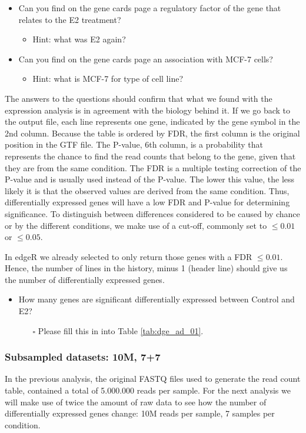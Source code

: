 \begin{itemize}
	\item Can you find on the gene cards page a regulatory factor of the gene that relates
to the E2 treatment?
	\begin{itemize}
		\item Hint: what was E2 again?
	\end{itemize}
	\item Can you find on the gene cards page an association with MCF-7 cells?
	\begin{itemize}
		\item Hint: what is MCF-7 for type of cell line?
	\end{itemize}
\end{itemize}
The answers to the questions should confirm that what we found with the expression analysis is in agreement with the biology behind it.
If we go back to the output file, each line represents one gene, indicated by the gene symbol in the 2nd column.
Because the table is ordered by FDR, the first column is the original position in the GTF file.
The P-value, 6th column, is a probability that represents the chance to find the read counts that belong to the gene, given that they are from the same condition.
The FDR is a multiple testing correction of the P-value and is usually used instead of the P-value. The lower this value, the less likely it is that the observed values are derived from the same condition. Thus, differentially expressed genes will have a low FDR and P-value for determining significance.
To distinguish between differences considered to be caused by chance or by the different conditions, we make use of a cut-off, commonly set to $\leq 0.01$ or $\leq 0.05$.

In edgeR we already selected to only return those genes with a FDR $\leq 0.01$.
Hence, the number of lines in the history, minus 1 (header line) should give us the number of differentially expressed genes.
\begin{itemize}
	\item How many genes are significant differentially expressed between Control and E2? 
	\begin{itemize}
		\item[$\square$] Please fill this in into Table \ref{tab:dge_ad_01}.
	\end{itemize}
\end{itemize}

\subsubsection{Subsampled datasets: 10M, 7+7}
In the previous analysis, the original FASTQ files used to generate the read count table, contained a total of 5.000.000 reads per sample.
For the next analysis we will make use of twice the amount of raw data to see how the number of differentially expressed genes change: 10M reads per sample, 7 samples per condition.

